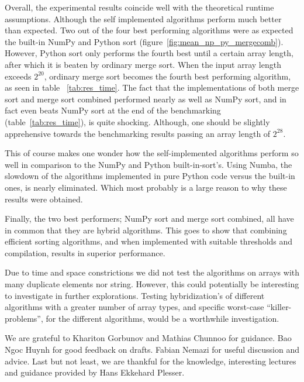 \documentclass[sigconf, nonacm, natbib, screen, balance=False]{acmart}
\begin{document}
Overall, the experimental results coincide well with the theoretical runtime assumptions. Although the self implemented algorithms perform much better than expected. Two out of the four best performing algorithms were as expected the built-in NumPy and Python sort (figure~\ref{fig:mean_np_py_mergecomb}). However, Python sort only performs the fourth best until a certain array length, after which it is beaten by ordinary merge sort. When the input array length exceeds $2^{20}$, ordinary merge sort becomes the fourth best performing algorithm, as seen in table ~\ref{tab:res_time}. The fact that the implementations of both merge sort and merge sort combined performed nearly as well as NumPy sort, and in fact even beats NumPy sort at the end of the benchmarking (table~\ref{tab:res_time}), is quite shocking. Although, one should be slightly apprehensive towards the benchmarking results passing an array length of $2^{28}$. 

This of course makes one wonder how the self-implemented algorithms perform so well in comparison to the NumPy and Python built-in-sort's. Using Numba, the slowdown of the algorithms implemented in pure Python code versus the built-in ones, is nearly eliminated. Which most probably is a large reason to why these results were obtained.

Finally, the two best performers; NumPy sort and merge sort combined, all have in common that they are hybrid algorithms. This goes to show that combining efficient sorting algorithms, and when implemented with suitable thresholds and compilation, results in superior performance.

Due to time and space constrictions we did not test the algorithms on arrays with many duplicate elements nor string. However, this could potentially be interesting to investigate in further explorations. Testing hybridization's of different algorithms with a greater number of array types, and specific worst-case ``killer-problems'', for the different algorithms, would be a worthwhile investigation.

\begin{acks}

We are grateful to Khariton Gorbunov and Mathias Chunnoo for guidance. Bao Ngoc Huynh for good feedback on drafts. Fabian Nemazi for useful discussion and advice. Last but not least, we are thankful for the knowledge, interesting lectures and guidance provided by Hans Ekkehard Plesser.

\end{acks}



\end{document}
